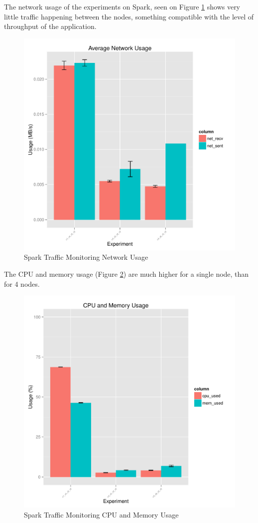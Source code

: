 \documentclass[ppgc,diss,english]{iiufrgs}
\begin{document}
The network usage of the experiments on Spark, seen on Figure \ref{fig:spark_trafficmonitoring_network} shows very little traffic happening between the nodes, something compatible with the level of throughput of the application.

\begin{figure}[H]
    \centering
	\includegraphics[width=.6\textwidth]{summaries/spark_trafficmonitoring/network.pdf}
	\caption{Spark Traffic Monitoring Network Usage}
	\label{fig:spark_trafficmonitoring_network}
\end{figure}

The CPU and memory usage (Figure \ref{fig:spark_trafficmonitoring_cpu_mem}) are much higher for a single node, than for 4 nodes.

\begin{figure}[H]
    \centering
	\includegraphics[width=.6\textwidth]{summaries/spark_trafficmonitoring/cpu_mem.pdf}
	\caption{Spark Traffic Monitoring CPU and Memory Usage}
	\label{fig:spark_trafficmonitoring_cpu_mem}
\end{figure}
\end{document}

